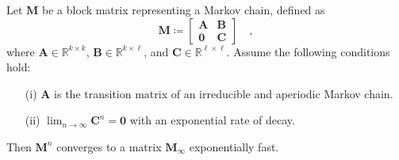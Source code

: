 \documentclass[../../main.tex]{subfiles}
\begin{document}
    \begin{lemma}
    \label{lemma:exponential_convergence_with_open_states}
    Let $\bm{M}$ be a block matrix representing a Markov chain, defined as
    \[
        \bm{M} \coloneqq
        \begin{bmatrix}
            \bm{A} & \bm{B} \\
            \bm{0} & \bm{C}
        \end{bmatrix}
        \quad ,
    \]
    where \( \bm{A} \in \mathbb{R}^{k \times k} \), \( \bm{B} \in \mathbb{R}^{k \times \ell} \), and \( \bm{C} \in \mathbb{R}^{\ell \times \ell} \).
    Assume the following conditions hold:
    \begin{enumerate}
        \item[\textnormal{(i)}] $\bm{A}$ is the transition matrix of an irreducible and aperiodic Markov chain.
        \item[\textnormal{(ii)}] $\lim_{n \to \infty} \bm{C}^n = \bm{0}$ with an exponential rate of decay.
    \end{enumerate}
    Then $\bm{M}^n$ converges to a matrix $\bm{M}_\infty$ exponentially fast.
\end{lemma}
\end{document}
